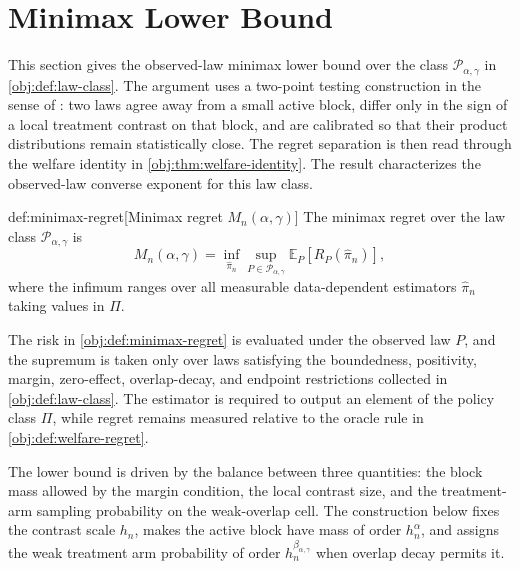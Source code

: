 \section{Minimax Lower Bound}

This section gives the observed-law minimax lower bound over the class \(\mathcal P_{\alpha,\gamma}\) in \cref{obj:def:law-class}.  The argument uses a two-point testing construction in the sense of \citet{LeCam1986}: two laws agree away from a small active block, differ only in the sign of a local treatment contrast on that block, and are calibrated so that their product distributions remain statistically close.  The regret separation is then read through the welfare identity in \cref{obj:thm:welfare-identity}.  The result characterizes the observed-law converse exponent for this law class.

\begin{definitionv}{def:minimax-regret}[Minimax regret $M_n(\alpha,\gamma)$]
The minimax regret over the law class \(\mathcal P_{\alpha,\gamma}\) is
\[
M_n(\alpha,\gamma)
=
\inf_{\widehat\pi_n}
\sup_{P\in\mathcal P_{\alpha,\gamma}}
\mathbb E_P\!\left[
R_P(\widehat\pi_n)
\right],
\]
where the infimum ranges over all measurable data-dependent estimators \(\widehat\pi_n\) taking values in \(\Pi\).
\end{definitionv}

The risk in \cref{obj:def:minimax-regret} is evaluated under the observed law \(P\), and the supremum is taken only over laws satisfying the boundedness, positivity, margin, zero-effect, overlap-decay, and endpoint restrictions collected in \cref{obj:def:law-class}.  The estimator is required to output an element of the policy class \(\Pi\), while regret remains measured relative to the oracle rule in \cref{obj:def:welfare-regret}.

The lower bound is driven by the balance between three quantities: the block mass allowed by the margin condition, the local contrast size, and the treatment-arm sampling probability on the weak-overlap cell.  The construction below fixes the contrast scale \(h_n\), makes the active block have mass of order \(h_n^\alpha\), and assigns the weak treatment arm probability of order \(h_n^{\beta_{\alpha,\gamma}}\) when overlap decay permits it.

